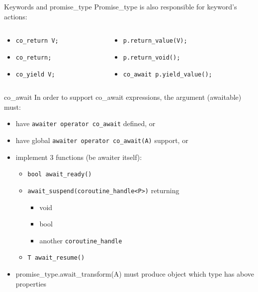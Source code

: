 \documentclass[10pt]{beamer}
\begin{document}
\begin{frame}{Keywords and promise\_type}
	Promise\_type is also responsible for keyword's actions:
	\vfill

	\begin{columns}
		\begin{column}{0.48\linewidth}
			\begin{footnotesize}
			\begin{itemize}[<+-|alert@+>]
				\item \texttt{co\_return V;}
				\item \texttt{co\_return;}
				\item \texttt{co\_yield V;}
			\end{itemize}
			\end{footnotesize}	
		\end{column}
		\begin{column}{0.48\linewidth}
			\begin{footnotesize}
			\begin{itemize}[<+-|alert@+>]
				\item<1- |alert@1> \texttt{p.return\_value(V);}
				\item<2- |alert@2> \texttt{p.return\_void();}
				\item<3- |alert@3> \texttt{co\_await p.yield\_value();}
			\end{itemize}
			\end{footnotesize}	
		\end{column}
	\end{columns}
\end{frame}

\begin{frame}{co\_await}
	In order to support \alert{co\_await} expressions, the argument (awaitable) must:
	\begin{itemize}[<+-|alert@+>]
		\item have \texttt{awaiter operator co\_await} defined, or
		\item have global \texttt{awaiter operator co\_await(A)} support, or
		\item implement 3 functions (be awaiter itself):
		\begin{itemize}
			\item \texttt{bool await\_ready()}
			\item \texttt{await\_suspend(coroutine\_handle<P>)} returning
			\begin{itemize}
				\item void 
				\item bool
				\item another \texttt{coroutine\_handle}
			\end{itemize}
			\item \texttt{T await\_resume()}
		\end{itemize}
		\item promise\_type.await\_transform(A) must produce object which type has above properties
	\end{itemize}
\end{frame}
\end{document}
